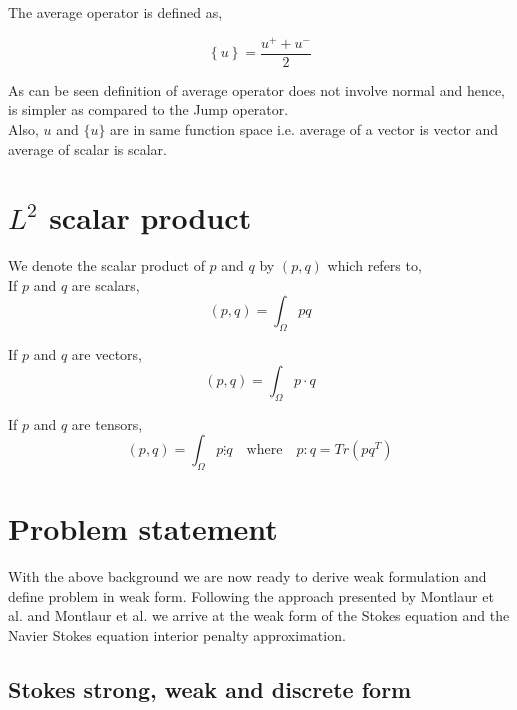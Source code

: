 \documentclass[a4paper]{book}
\begin{document}
The average operator is defined as,

\begin{equation}\label{average operator}
\left\lbrace u \right\rbrace = \frac{u^+ + u^-}{2}  
\end{equation} 

As can be seen definition of average operator does not involve normal and hence, is simpler as compared to the Jump operator.\\
Also, $u$ and $\lbrace u \rbrace$ are in same function space i.e. average of a vector is vector and average of scalar is scalar.\\

\section{$L^2$ scalar product}

We denote the scalar product of $p$ and $q$ by $(p,q)$ which refers to,\\

If $p$ and $q$ are scalars,
\begin{equation}\label{inner product scalars}
(p,q)=\int_{\Omega} pq
\end{equation}

If $p$ and $q$ are vectors,
\begin{equation}\label{Inner product vectors}
(p,q)=\int_{\Omega} p \cdot q 
\end{equation}

If $p$ and $q$ are tensors,
\begin{equation}\label{Inner product tensors}
(p,q)=\int_{\Omega} p \vdots q \quad \textrm{where} \quad p:q = Tr(pq^T)
\end{equation}

\section{Problem statement}

With the above background we are now ready to derive weak formulation and define problem in weak form. Following the approach presented by Montlaur et al. \cite{Montlaur} and Montlaur et al. \cite{Montlaur2} we arrive at the weak form of the Stokes equation and the Navier Stokes equation interior penalty approximation.

\subsection{Stokes strong, weak and discrete form} \label{Stokes_flow_ch3}
\end{document}
